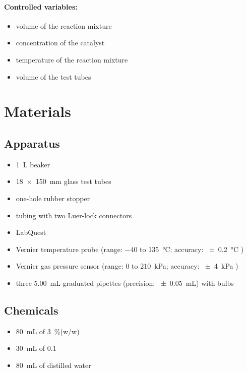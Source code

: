 \documentclass[a4paper, 12pt]{article}
\begin{document}
\paragraph{Controlled variables:}
\begin{itemize}
    \item volume of the reaction mixture
    \item concentration of the  catalyst
    \item temperature of the reaction mixture
    \item volume of the test tubes
\end{itemize}

\section*{Materials}
\subsection*{Apparatus}
\begin{itemize}
    \itemsep 0em
    \item \SI{1}{\L} beaker
    \item \SI{18x150}{\mm} glass test tubes
    \item one-hole rubber stopper
    \item tubing with two Luer-lock connectors
    \item LabQuest
    \item Vernier temperature probe (range: \num{-40} to \SI{135}{\celsius}; accuracy: \SI{+-0.2}{\celsius} \autocite{vernier_temperature})
    \item Vernier gas pressure sensor (range: \num{0} to \SI{210}{\kPa}; accuracy: \SI{+-4}{\kPa} \autocite{vernier_gas_pressure})
    \item three \SI{5.00}{\mL} graduated pipettes (precision: \SI{+-0.05}{\mL}) with bulbs
\end{itemize}

\subsection*{Chemicals}
\begin{itemize}
    \itemsep 0em
    \item \SI{80}{\mL} of \SI{3}{\percent}(w/w) 
    \item \SI{30}{\mL} of \SI{0.1}{\molar} 
    \item \SI{80}{\mL} of distilled water
\end{itemize}
\end{document}
